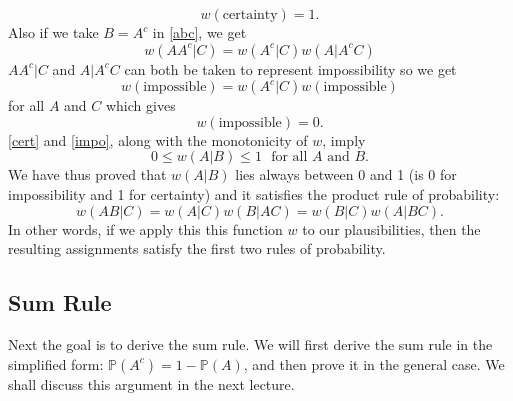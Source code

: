 \documentclass{scrartcl}
\renewcommand{\P}{{\mathbb P}}
\begin{document}
\begin{equation}\label{cert}
  w(\text{certainty}) = 1. 
\end{equation}
Also if we take $B = A^c$ in \eqref{abc}, we get
\begin{equation*}
  w(AA^c | C) = w(A^c|C) w(A|A^c C)
\end{equation*}
$AA^c|C$ and $A|A^cC$ can both be taken to represent impossibility so
we get
\begin{equation*}
  w(\text{impossible}) = w(A^c|C) w(\text{impossible})
\end{equation*}
for all $A$ and $C$ which gives
\begin{equation}\label{impo}
  w(\text{impossible}) = 0. 
\end{equation}
\eqref{cert} and \eqref{impo}, along with the monotonicity of $w$,
imply
\begin{equation}\label{w01}
0 \leq  w(A|B) \leq 1 ~~~ \text{for all $A$ and $B$}. 
\end{equation}
We have thus proved that $w(A|B)$ lies always between 0 and 1 (is 0
for impossibility and 1 for certainty) and it satisfies the product
rule of probability: 
\begin{equation}\label{w1}
  w(AB|C) = w(A|C) w(B|AC) = w(B|C) w(A | BC). 
\end{equation}
In other words, if we apply this this function $w$ to our plausibilities, then the
resulting assignments satisfy the first two rules of
probability.

\subsection{Sum Rule}

Next the goal is to derive the sum rule. We will first derive the sum rule
in the simplified form: $\P(A^c) = 1 - \P(A)$, and then prove it in
the general case. We shall discuss this argument in the next lecture. 
\end{document}

